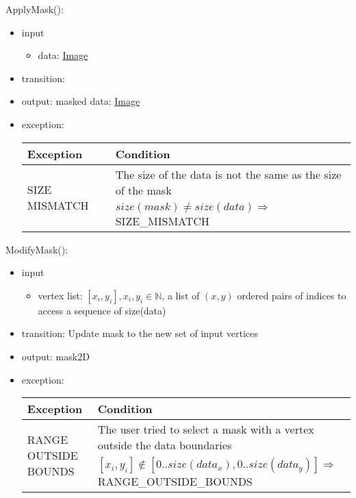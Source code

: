 \documentclass[12pt, titlepage]{article}
\begin{document}
\noindent ApplyMask():
\begin{itemize}
    \item input
    \begin{itemize}
        \item data: \hyperref[Mod:Image]{Image}
    \end{itemize}
    \item transition:
    \item output: masked data: \hyperref[Mod:Image]{Image}
    \item exception:
    \begin{center}
        \begin{tabular}{p{3.5cm} p{12cm}}
            \toprule[0.15em]
            \textbf{Exception} & \textbf{Condition}\\
            \midrule[0.1em]
            \multirow{2}{0.25\textwidth}{SIZE MISMATCH} & The size of the data
            is not the same as the size of the mask\\ 
            & $size(mask) \neq size(data) \Rightarrow$ SIZE\_MISMATCH\\ 
            \bottomrule[0.15em]
        \end{tabular}
    \end{center}
\end{itemize}

\noindent ModifyMask():
\begin{itemize}
    \item input
    \begin{itemize}
        \item vertex list: $[x_i, y_i], x_i, y_i \in \mathbb{N}$, a list of
        $(x,y)$ ordered pairs of indices to access a sequence of size(data)
    \end{itemize}
    \item transition: Update mask to the new set of input vertices
    \item output: mask2D
    \item exception:
    \begin{center}
        \begin{tabular}{p{3.5cm} p{12cm}}
            \toprule[0.15em]
            \textbf{Exception} & \textbf{Condition}\\
            \midrule[0.1em]
            \multirow{2}{0.25\textwidth}{RANGE OUTSIDE BOUNDS} & The user tried
            to select a mask with a vertex outside the data boundaries\\ 
            & $[x_i, y_i] \notin [0..size(data_x), 0..size(data_y)] \Rightarrow$
            RANGE\_OUTSIDE\_BOUNDS\\ 
            \bottomrule[0.15em]
        \end{tabular}
    \end{center}
\end{itemize}
\end{document}
